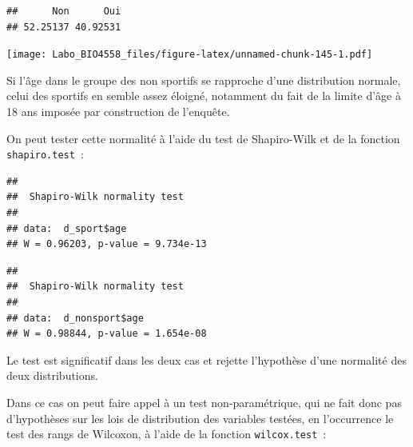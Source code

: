 \documentclass[12pt,]{book}
\newenvironment{Shaded}{\begin{snugshade}}{\end{snugshade}}
\newcommand{\KeywordTok}[1]{\textcolor[rgb]{0.27,0.27,0.27}{\textbf{#1}}}
\newcommand{\NormalTok}[1]{#1}
\newcommand{\OperatorTok}[1]{\textcolor[rgb]{0.43,0.43,0.43}{\textbf{#1}}}
\begin{document}
\begin{verbatim}
##      Non      Oui 
## 52.25137 40.92531
\end{verbatim}

\begin{Shaded}
\end{Shaded}

\texttt{[image: Labo\_BIO4558\_files/figure-latex/unnamed-chunk-145-1.pdf]}

Si l'âge dans le groupe des non sportifs se rapproche d'une distribution normale, celui des sportifs en semble assez éloigné, notamment du fait de la limite d'âge à 18 ans imposée par construction de l'enquête.

On peut tester cette normalité à l'aide du test de Shapiro-Wilk et de la fonction \texttt{shapiro.test}~:

\begin{Shaded}
\end{Shaded}

\begin{verbatim}
## 
## 	Shapiro-Wilk normality test
## 
## data:  d_sport$age
## W = 0.96203, p-value = 9.734e-13
\end{verbatim}

\begin{Shaded}
\end{Shaded}

\begin{verbatim}
## 
## 	Shapiro-Wilk normality test
## 
## data:  d_nonsport$age
## W = 0.98844, p-value = 1.654e-08
\end{verbatim}

Le test est significatif dans les deux cas et rejette l'hypothèse d'une normalité des deux distributions.

Dans ce cas on peut faire appel à un test non-paramétrique, qui ne fait donc pas d'hypothèses sur les lois de distribution des variables testées, en l'occurrence le test des rangs de Wilcoxon, à l'aide de la fonction \texttt{wilcox.test}~:
\end{document}
